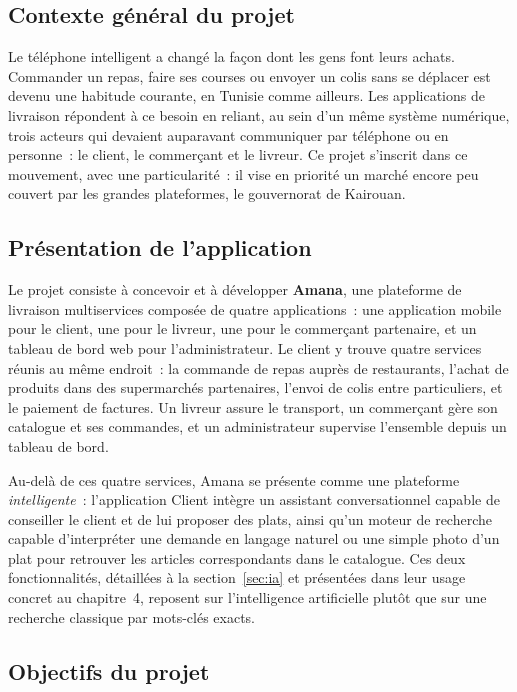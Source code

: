 \documentclass[12pt,fleqn,a4paper]{report}
\begin{document}
\begin{justify}
\renewcommand{\thepage}{\arabic{page}}
\setcounter{page}{1}

\subsection*{Contexte général du projet}

Le téléphone intelligent a changé la façon dont les gens font leurs achats. Commander un repas, faire ses courses ou envoyer un colis sans se déplacer est devenu une habitude courante, en Tunisie comme ailleurs. Les applications de livraison répondent à ce besoin en reliant, au sein d'un même système numérique, trois acteurs qui devaient auparavant communiquer par téléphone ou en personne~: le client, le commerçant et le livreur. Ce projet s'inscrit dans ce mouvement, avec une particularité~: il vise en priorité un marché encore peu couvert par les grandes plateformes, le gouvernorat de Kairouan.

\subsection*{Présentation de l'application}

Le projet consiste à concevoir et à développer \textbf{Amana}, une plateforme de livraison multiservices composée de quatre applications~: une application mobile pour le client, une pour le livreur, une pour le commerçant partenaire, et un tableau de bord web pour l'administrateur. Le client y trouve quatre services réunis au même endroit~: la commande de repas auprès de restaurants, l'achat de produits dans des supermarchés partenaires, l'envoi de colis entre particuliers, et le paiement de factures. Un livreur assure le transport, un commerçant gère son catalogue et ses commandes, et un administrateur supervise l'ensemble depuis un tableau de bord.

Au-delà de ces quatre services, Amana se présente comme une plateforme \textit{intelligente}~: l'application Client intègre un assistant conversationnel capable de conseiller le client et de lui proposer des plats, ainsi qu'un moteur de recherche capable d'interpréter une demande en langage naturel ou une simple photo d'un plat pour retrouver les articles correspondants dans le catalogue. Ces deux fonctionnalités, détaillées à la section~\ref{sec:ia} et présentées dans leur usage concret au chapitre~4, reposent sur l'intelligence artificielle plutôt que sur une recherche classique par mots-clés exacts.

\subsection*{Objectifs du projet}


\end{justify}
\end{document}

